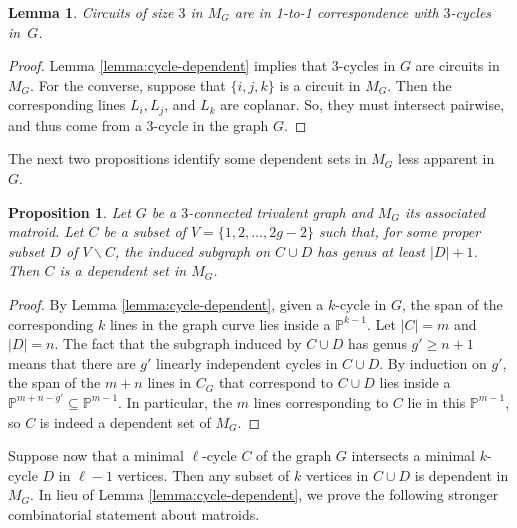 \documentclass[12pt]{extarticle}
\newtheorem{proposition}[theorem]{Proposition}
\newtheorem{lemma}[theorem]{Lemma}
\theoremstyle{definition}
\numberwithin{theorem}{section}
\theoremstyle{plain}\newtheorem{ithm}{Theorem}
\newcommand{\PP}{\mathbb{P}}
\begin{document}
\begin{lemma}\label{lem:3cycles}
  Circuits of size $3$ in $M_G$ are in 1-to-1 correspondence with $3$-cycles in~$G$.
\end{lemma}

\begin{proof}
  Lemma \ref{lemma:cycle-dependent} implies that $3$-cycles in $G$ are circuits in $M_G$.
For the converse, suppose that $\{i,j,k\}$ is a circuit in $M_G$.
Then the corresponding lines 
   $L_i, L_j$, and $L_k$ are coplanar. So, they must intersect pairwise, and thus come
    from a $3$-cycle in the graph $G$.
\end{proof}

The next two propositions identify some dependent sets in $M_G$ less apparent in~$G$.

\begin{proposition} \label{prop:CD}
  Let $G$ be a $3$-connected trivalent graph and
  $M_G$ its associated matroid. Let $C$ be a subset of
  $V = \{1,2,\ldots,2g-2\}$  such that, for some
  proper subset $D$ of $V \backslash C$,
  the induced subgraph on $C \cup D$ has 
  genus at least $|D| + 1$. Then $C$ is a dependent set in $M_G$.
\end{proposition}

\begin{proof}
  By Lemma \ref{lemma:cycle-dependent}, given a $k$-cycle in $G$, the span of the corresponding $k$ lines in the graph curve lies inside a $\PP^{k-1}$. 
  Let $|C| = m$ and $|D| = n$. The fact that the subgraph induced by $C \cup D$ has genus $g' \geq n + 1$ means that there are $g'$ linearly independent cycles in $C \cup D$. By induction on $g'$, the span of the $m+n$ lines in $C_G$ that correspond to $C \cup D$ lies inside a $\PP^{m+n - g'} \subseteq \PP^{m-1}$. In particular, the $m$ lines corresponding to $C$ lie in this $\PP^{m-1}$, so 
  $C$ is indeed a dependent set of $M_G$.
\end{proof}

Suppose now that a minimal $\ell$-cycle $C$ of the graph $G$ intersects a minimal $k$-cycle $D$ in $\ell-1$ vertices. 
  Then any subset of $k$ vertices in $C\cup D$ is dependent in $M_G$. In lieu of Lemma \ref{lemma:cycle-dependent}, we prove the following stronger combinatorial statement about matroids.
\end{document}
